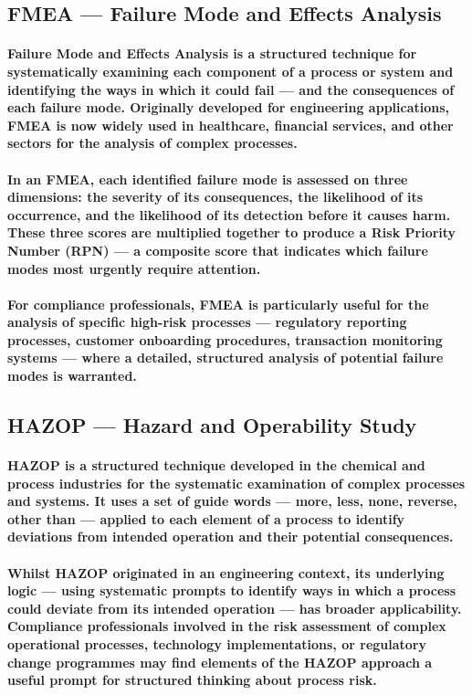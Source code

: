 \subsection{FMEA — Failure Mode and Effects Analysis}
\paragraph{\textbf{Failure Mode and Effects Analysis} is a structured technique for systematically examining each component of a process or system and identifying the ways in which it could fail — and the consequences of each failure mode. Originally developed for engineering applications, FMEA is now widely used in healthcare, financial services, and other sectors for the analysis of complex processes.}
\paragraph{In an FMEA, each identified failure mode is assessed on three dimensions: the severity of its consequences, the likelihood of its occurrence, and the likelihood of its detection before it causes harm. These three scores are multiplied together to produce a \textbf{Risk Priority Number (RPN)} — a composite score that indicates which failure modes most urgently require attention.}
\paragraph{For compliance professionals, FMEA is particularly useful for the analysis of specific high-risk processes — regulatory reporting processes, customer onboarding procedures, transaction monitoring systems — where a detailed, structured analysis of potential failure modes is warranted.}

\subsection{HAZOP — Hazard and Operability Study}
\paragraph{\textbf{HAZOP} is a structured technique developed in the chemical and process industries for the systematic examination of complex processes and systems. It uses a set of guide words — more, less, none, reverse, other than — applied to each element of a process to identify deviations from intended operation and their potential consequences.}
\paragraph{Whilst HAZOP originated in an engineering context, its underlying logic — using systematic prompts to identify ways in which a process could deviate from its intended operation — has broader applicability. Compliance professionals involved in the risk assessment of complex operational processes, technology implementations, or regulatory change programmes may find elements of the HAZOP approach a useful prompt for structured thinking about process risk.}

